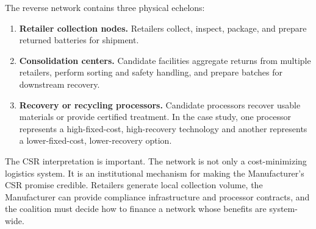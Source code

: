 The reverse network contains three physical echelons:
\begin{enumerate}
    \item \textbf{Retailer collection nodes.} Retailers collect, inspect, package, and prepare returned batteries for shipment.
    \item \textbf{Consolidation centers.} Candidate facilities aggregate returns from multiple retailers, perform sorting and safety handling, and prepare batches for downstream recovery.
    \item \textbf{Recovery or recycling processors.} Candidate processors recover usable materials or provide certified treatment. In the case study, one processor represents a high-fixed-cost, high-recovery technology and another represents a lower-fixed-cost, lower-recovery option.
\end{enumerate}

The CSR interpretation is important. The network is not only a cost-minimizing logistics system. It is an institutional mechanism for making the Manufacturer's CSR promise credible. Retailers generate local collection volume, the Manufacturer can provide compliance infrastructure and processor contracts, and the coalition must decide how to finance a network whose benefits are system-wide.

